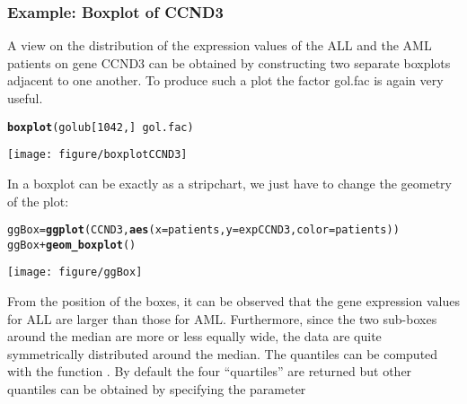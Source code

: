 \documentclass{article}\usepackage[]{graphicx}\usepackage[usenames,dvipsnames]{color}
\makeatletter
\def\maxwidth{ %
  \ifdim\Gin@nat@width>\linewidth
    \linewidth
  \else
    \Gin@nat@width
  \fi
}
\newcommand{\hlnum}[1]{\textcolor[rgb]{0.686,0.059,0.569}{#1}}%
\newcommand{\hlopt}[1]{\textcolor[rgb]{0,0,0}{#1}}%
\newcommand{\hlstd}[1]{\textcolor[rgb]{0.345,0.345,0.345}{#1}}%
\newcommand{\hlkwb}[1]{\textcolor[rgb]{0.69,0.353,0.396}{#1}}%
\newcommand{\hlkwc}[1]{\textcolor[rgb]{0.333,0.667,0.333}{#1}}%
\newcommand{\hlkwd}[1]{\textcolor[rgb]{0.737,0.353,0.396}{\textbf{#1}}}%
\newenvironment{kframe}{%
 \def\at@end@of@kframe{}%
 \ifinner\ifhmode%
  \def\at@end@of@kframe{\end{minipage}}%
  \begin{minipage}{\columnwidth}%
 \fi\fi%
 \def\FrameCommand##1{\hskip\@totalleftmargin \hskip-\fboxsep
 \colorbox{shadecolor}{##1}\hskip-\fboxsep
     \hskip-\linewidth \hskip-\@totalleftmargin \hskip\columnwidth}%
 \MakeFramed {\advance\hsize-\width
   \@totalleftmargin\z@ \linewidth\hsize
   \@setminipage}}%
 {\par\unskip\endMakeFramed%
 \at@end@of@kframe}
\newenvironment{knitrout}{}{} %
\makeatother
\begin{document}
\subsubsection*{Example: Boxplot of CCND3}
A view on the distribution of the expression values of the
ALL and the AML patients on gene CCND3  can be obtained by
constructing two separate boxplots adjacent to one another. To produce such
a plot the factor gol.fac is again very useful.
%
\begin{knitrout}
\color{fgcolor}\begin{kframe}
\begin{alltt}
\hlkwd{boxplot}\hlstd{(golub[}\hlnum{1042}\hlstd{,]} \hlopt{~} \hlstd{gol.fac)}
\end{alltt}
\end{kframe}
\texttt{[image: figure/boxplotCCND3]} 

\end{knitrout}
%

In  a boxplot can be exactly as a stripchart,
we just have to change the geometry of the plot:

\begin{knitrout}
\color{fgcolor}\begin{kframe}
\begin{alltt}
\hlstd{ggBox}\hlkwb{=}  \hlkwd{ggplot}\hlstd{(CCND3,} \hlkwd{aes}\hlstd{(}\hlkwc{x}\hlstd{=patients,} \hlkwc{y}\hlstd{=expCCND3,} \hlkwc{color} \hlstd{= patients))}
\hlstd{ggBox} \hlopt{+} \hlkwd{geom_boxplot}\hlstd{()}
\end{alltt}
\end{kframe}
\texttt{[image: figure/ggBox]} 

\end{knitrout}

From the position of the boxes,  it can be observed that the gene
expression values for ALL are larger than those for AML. Furthermore, since
the two sub-boxes around the median are more or less equally wide, the data
are quite symmetrically distributed around the median. The quantiles can
be computed with the function  . By default the four
``quartiles'' are returned but other quantiles can be obtained by specifying
the  parameter
\end{document}
